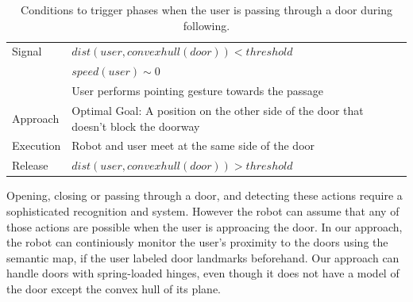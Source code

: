 \begin{table}[ht!]
	\caption{Conditions to trigger phases when the user is passing through a door during following.}
	\centering
  \begin{tabular}{l |  m{10cm}}    
    \toprule    
    Signal & {$dist(user, convexhull(door))<threshold$}\\         
    	      & {$speed(user)\sim 0$} \\
	      & {User performs pointing gesture towards the passage}\\ \midrule	                           
    Approach & {Optimal Goal: A position on the other side of the door that doesn't block the doorway}\\       \midrule
    Execution & {Robot and user meet at the same side of the door}\\  \midrule
    Release & {$dist(user, convexhull(door))>threshold$ }\\ 
    \bottomrule
  \end{tabular}
    \label{table:situation_aware_list_door}
\end{table}


Opening, closing or passing through a door, and detecting these actions require a sophisticated recognition and system. However the robot can assume that any of those actions are possible when the user is approacing the door. In our approach, the robot can continiously monitor the user's proximity to the doors using the semantic map, if the user labeled door landmarks beforehand. Our approach can handle doors with spring-loaded hinges, even though it does not have a model of the door except the convex hull of its plane.

